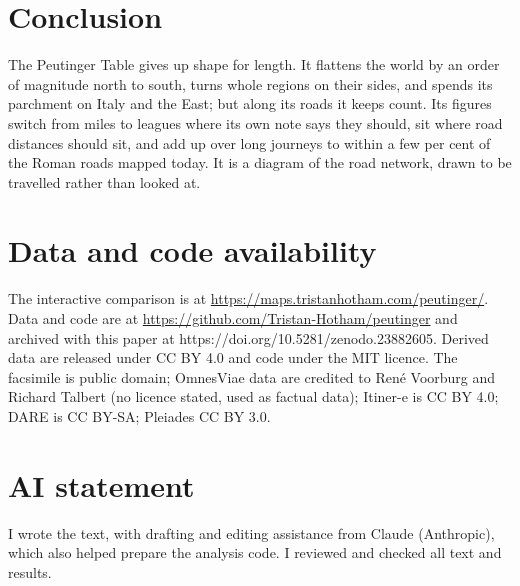 \documentclass[11pt,a4paper]{article}
\begin{document}
\section{Conclusion}
The Peutinger Table gives up shape for length. It flattens the world by an order of magnitude north to south, turns whole regions on their sides, and spends its parchment on Italy and the East; but along its roads it keeps count. Its figures switch from miles to leagues where its own note says they should, sit where road distances should sit, and add up over long journeys to within a few per cent of the Roman roads mapped today. It is a diagram of the road network, drawn to be travelled rather than looked at.

\section*{Data and code availability}
The interactive comparison is at \url{https://maps.tristanhotham.com/peutinger/}. Data and code are at \url{https://github.com/Tristan-Hotham/peutinger} and archived with this paper at https://doi.org/10.5281/zenodo.23882605. Derived data are released under CC BY 4.0 and code under the MIT licence. The facsimile is public domain; OmnesViae data are credited to Ren\'e Voorburg and Richard Talbert (no licence stated, used as factual data); Itiner-e is CC BY 4.0; DARE is CC BY-SA; Pleiades CC BY 3.0.

\section*{AI statement}
I wrote the text, with drafting and editing assistance from Claude (Anthropic), which also helped prepare the analysis code. I reviewed and checked all text and results.
\end{document}
